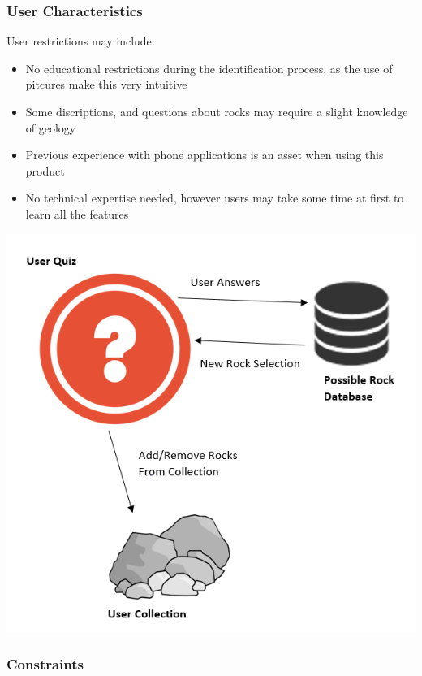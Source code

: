 \documentclass[titlepage]{article}
\begin{document}
\subsubsection{User Characteristics}

User restrictions may include:\\
\begin{itemize}

\item  No educational restrictions during the identification process, as the use of pitcures make this very intuitive\\
\item Some discriptions, and questions about rocks may require a slight knowledge of geology \\
\item Previous experience with phone applications is an asset when using this product\\
\item No technical expertise needed, however users may take some time at first to learn all the features\\

\end{itemize}

\includegraphics{Interaction.png}

\subsubsection{Constraints}
\end{document}
